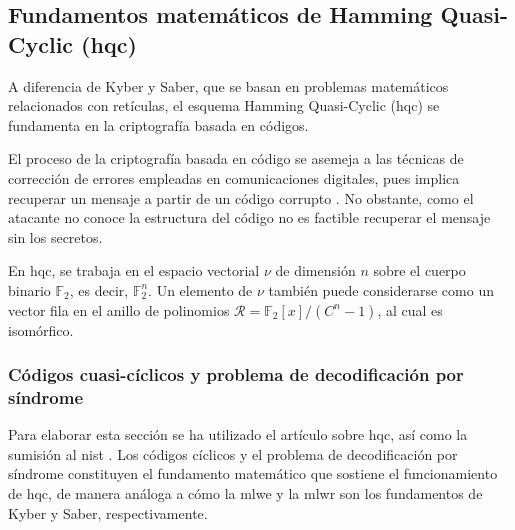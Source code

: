 \subsection{Fundamentos matemáticos de Hamming Quasi-Cyclic (\acrshort{hqc})}
A diferencia de Kyber y Saber, que se basan en problemas matemáticos relacionados con retículas, el esquema Hamming Quasi-Cyclic (\acrshort{hqc}) \cite{hqc-spec-2022} se fundamenta en la criptografía basada en códigos. 
\newline

El proceso de la criptografía basada en código se asemeja a las técnicas de corrección de errores empleadas en comunicaciones digitales, pues implica recuperar un mensaje a partir de un código corrupto \cite{SurveyCOdeBAsed}. No obstante, como el atacante no conoce la estructura del código no es factible recuperar el mensaje sin los secretos.
\newline

En \acrshort{hqc}, se trabaja en el espacio vectorial \(\nu\) de dimensión \(n\) sobre el cuerpo binario \(\mathbb{F}_2\), es decir, \(\mathbb{F}_2^n\). Un elemento de \(\nu\) también puede considerarse como un vector fila en el anillo de polinomios \(\mathcal{R} = \mathbb{F}_2[x]/(C^n-1)\), al cual es isomórfico. 

\subsubsection{Códigos cuasi-cíclicos y problema de decodificación por síndrome}
Para elaborar esta sección se ha utilizado el artículo sobre \acrshort{hqc}, así como la sumisión al \acrshort{nist} \cite{hqc-spec-2022}. Los códigos cíclicos y el problema de decodificación por síndrome constituyen el fundamento matemático que sostiene el funcionamiento de \acrshort{hqc}, de manera análoga a cómo la \acrshort{mlwe} y la \acrshort{mlwr} son los fundamentos de Kyber y Saber, respectivamente.
\newline

